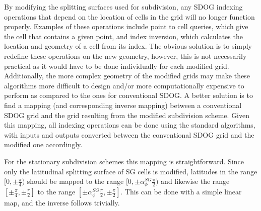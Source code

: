 By modifying the splitting surfaces used for subdivision, any SDOG indexing operations that depend on the location of cells in the grid will no longer function properly.
Examples of these operations include point to cell queries, which give the cell that contains a given point, and index inversion, which calculates the location and geometry of a cell from its index.
The obvious solution is to simply redefine these operations on the new geometry, however, this is not necessarily practical as it would have to be done individually for each modified grid.
Additionally, the more complex geometry of the modified grids may make these algorithms more difficult to design and/or more computationally expensive to perform as compared to the ones for conventional SDOG.
A better solution is to find a mapping (and corresponding inverse mapping) between a conventional SDOG grid and the grid resulting from the modified subdivision scheme.
Given this mapping, all indexing operations can be done using the standard algorithms, with inputs and outputs converted between the conventional SDOG grid and the modified one accordingly.


For the stationary subdivision schemes this mapping is straightforward.
Since only the latitudinal splitting surface of SG cells is modified, latitudes in the range $[0, \pm\frac{\pi}{4})$ should be mapped to the range $[0, \pm\alpha_{\phi}^{SG} \frac{\pi}{2})$ and likewise the range $[\pm\frac{\pi}{4}, \pm\frac{\pi}{2}]$ to the range $[\pm\alpha_{\phi}^{SG} \frac{\pi}{2}, \pm\frac{\pi}{2}]$.
This can be done with a simple linear map, and the inverse follows trivially.


